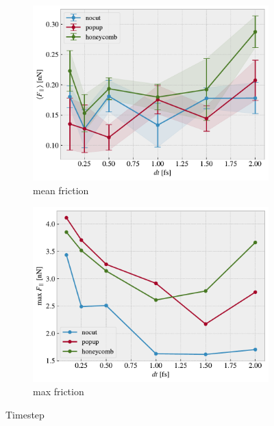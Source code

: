 \begin{figure}[H]
  \centering
  \begin{subfigure}[b]{0.49\textwidth}
      \centering
      \includegraphics[width=\textwidth]{figures/baseline/variables_dt_mean.pdf}
      \caption{mean friction}
      \label{fig:var_dt_mean}
  \end{subfigure}
  \hfill
  \begin{subfigure}[b]{0.49\textwidth}
      \centering
      \includegraphics[width=\textwidth]{figures/baseline/variables_dt_max.pdf}
      \caption{max friction}
      \label{fig:var_dt_max}
  \end{subfigure}
  \hfill
     \caption{Timestep}
     \label{fig:var_dt}
\end{figure}



